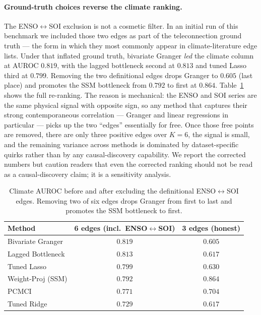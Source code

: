 \documentclass{article}
\begin{document}
\paragraph{Ground-truth choices reverse the climate ranking.} The
ENSO$\leftrightarrow$SOI exclusion is not a cosmetic filter. In an
initial run of this benchmark we included those two edges as part of
the teleconnection ground truth — the form in which they most commonly
appear in climate-literature edge lists. Under that inflated ground
truth, bivariate Granger \emph{led} the climate column at AUROC
$0.819$, with the lagged bottleneck second at $0.813$ and tuned Lasso
third at $0.799$. Removing the two definitional edges drops Granger
to $0.605$ (last place) and promotes the SSM bottleneck from $0.792$
to first at $0.864$. Table~\ref{tab:gt_flip} shows the full re-ranking.
The reason is mechanical: the ENSO and SOI series are the same
physical signal with opposite sign, so any method that captures their
strong contemporaneous correlation — Granger and linear regressions in
particular — picks up the two ``edges'' essentially for free. Once
those free points are removed, there are only three positive edges
over $K{=}6$, the signal is small, and the remaining variance across
methods is dominated by dataset-specific quirks rather than by any
causal-discovery capability. We report the corrected numbers but
caution readers that even the corrected ranking should not be read
as a causal-discovery claim; it is a sensitivity analysis.

\begin{table}[t]
\centering
\small
\caption{Climate AUROC before and after excluding the definitional
ENSO$\leftrightarrow$SOI edges. Removing two of six edges drops
Granger from first to last and promotes the SSM bottleneck to first.}
\label{tab:gt_flip}
\begin{tabular}{lcc}
\toprule
Method & 6 edges (incl.\ ENSO$\leftrightarrow$SOI) & 3 edges (honest) \\
\midrule
Bivariate Granger & $\mathbf{0.819}$ & $0.605$ \\
Lagged Bottleneck & $0.813$ & $0.617$ \\
Tuned Lasso & $0.799$ & $0.630$ \\
Weight-Proj (SSM) & $0.792$ & $\mathbf{0.864}$ \\
PCMCI & $0.771$ & $0.704$ \\
Tuned Ridge & $0.729$ & $0.617$ \\
\bottomrule
\end{tabular}
\end{table}
\end{document}
